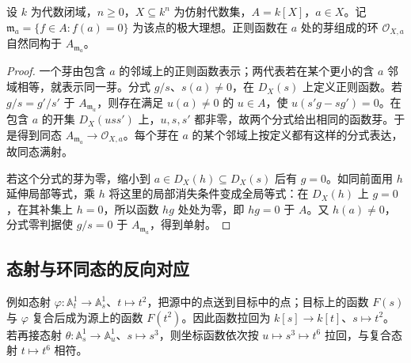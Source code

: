 \begin{proposition}\label{b3:prop:regular-germ-local-ring}
	设 \(k\) 为代数闭域，\(n\ge0\)，\(X\subseteq k^n\) 为仿射代数集，\(A=k[X]\)，\(a\in X\)。记 \(\mathfrak m_a=\{f\in A:f(a)=0\}\) 为该点的极大理想。正则函数在 \(a\) 处的芽组成的环 \(\mathcal O_{X,a}\) 自然同构于 \(A_{\mathfrak m_a}\)。
\end{proposition}
\begin{proof}
	一个芽由包含 \(a\) 的邻域上的正则函数表示；两代表若在某个更小的含 \(a\) 邻域相等，就表示同一芽。分式 \(g/s\)、\(s(a)\ne0\)，在 \(D_X(s)\) 上定义正则函数。若 \(g/s=g'/s'\) 于 \(A_{\mathfrak m_a}\)，则存在满足 \(u(a)\ne0\) 的 \(u\in A\)，使 \(u(s'g-sg')=0\)。在包含 \(a\) 的开集 \(D_X(uss')\) 上，\(u,s,s'\) 都非零，故两个分式给出相同的函数芽。于是得到同态 \(A_{\mathfrak m_a}\to\mathcal O_{X,a}\)。每个芽在 \(a\) 的某个邻域上按定义都有这样的分式表达，故同态满射。

	若这个分式的芽为零，缩小到 \(a\in D_X(h)\subseteq D_X(s)\) 后有 \(g=0\)。如同前面用 \(h\) 延伸局部等式，乘 \(h\) 将这里的局部消失条件变成全局等式：在 \(D_X(h)\) 上 \(g=0\)，在其补集上 \(h=0\)，所以函数 \(hg\) 处处为零，即 \(hg=0\) 于 \(A\)。又 \(h(a)\ne0\)，分式零判据使 \(g/s=0\) 于 \(A_{\mathfrak m_a}\)，得到单射。
\end{proof}

\subsection{态射与环同态的反向对应}
\label{b3:subsec:0702:03}

例如态射 \(\varphi:\mathbb A_t^1\to\mathbb A_s^1\)、\(t\mapsto t^2\)，把源中的点送到目标中的点；目标上的函数 \(F(s)\) 与 \(\varphi\) 复合后成为源上的函数 \(F(t^2)\)。因此函数拉回为 \(k[s]\to k[t]\)、\(s\mapsto t^2\)。若再接态射 \(\theta:\mathbb A_s^1\to\mathbb A_u^1\)、\(s\mapsto s^3\)，则坐标函数依次按 \(u\mapsto s^3\mapsto t^6\) 拉回，与复合态射 \(t\mapsto t^6\) 相符。

